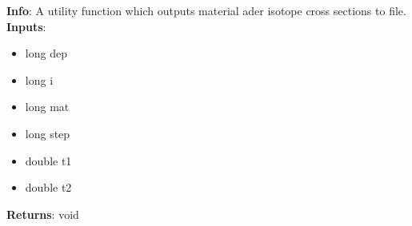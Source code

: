 \textbf{Info}: A utility function which outputs material ader isotope cross 
sections to file.\\ 

\noindent \textbf{Inputs}:
\begin{itemize}
\item{long dep}
\item{long i}
\item{long mat}
\item{long step}
\item{double t1}
\item{double t2}
\end{itemize}

\noindent \textbf{Returns}: void
